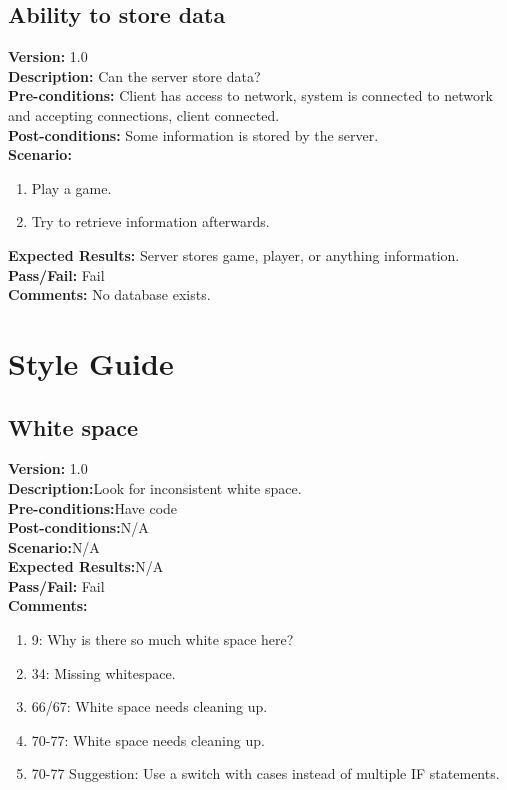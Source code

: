 \documentclass[12pt]{article}
\begin{document}
    \subsection{Ability to store data}
    \textbf{Version:} 1.0\\
    \textbf{Description:} Can the server store data?\\
    \textbf{Pre-conditions:} Client has access to network, system is connected to network and accepting connections, client connected.\\
    \textbf{Post-conditions:} Some information is stored by the server.\\
    \textbf{Scenario:}
    \begin{enumerate}
        \item Play a game.
        \item Try to retrieve information afterwards.
    \end{enumerate}
    \textbf{Expected Results:} Server stores game, player, or anything information.\\
    \textbf{Pass/Fail:} Fail\\
    \textbf{Comments:} No database exists.\\

\newpage

\section{Style Guide}
\label{sec:styleCases}

    \subsection{White space}
    \textbf{Version:} 1.0\\
    \textbf{Description:}Look for inconsistent white space.\\
    \textbf{Pre-conditions:}Have code\\
    \textbf{Post-conditions:}N/A\\
    \textbf{Scenario:}N/A\\
    \textbf{Expected Results:}N/A\\
    \textbf{Pass/Fail:} Fail\\
    \textbf{Comments:}
    \begin{enumerate}
        \item 9: Why is there so much white space here?
        \item 34: Missing whitespace.
        \item 66/67: White space needs cleaning up.
        \item 70-77: White space needs cleaning up.
        \item 70-77 Suggestion: Use a switch with cases instead of multiple IF statements.
    \end{enumerate}
\end{document}
